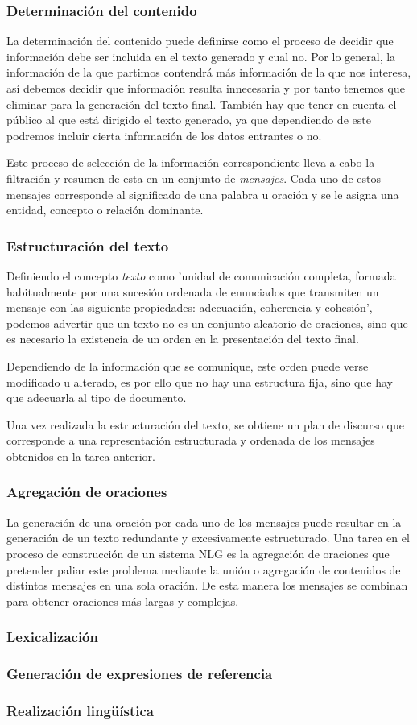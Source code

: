 \subsubsection{Determinación del contenido}
La determinación del contenido puede definirse como el proceso de decidir que información debe ser incluida en el texto generado y cual no. Por lo general, la información de la que partimos contendrá más información de la que nos interesa, así debemos decidir que información resulta innecesaria y por tanto tenemos que eliminar para la generación del texto final. También hay que tener en cuenta el público al que está dirigido el texto generado, ya que dependiendo de este podremos incluir cierta información de los datos entrantes o no.

Este proceso de selección de la información correspondiente lleva a cabo la filtración y resumen de esta en un conjunto de \textit{mensajes}. Cada uno de estos mensajes corresponde al significado de una palabra u oración y se le asigna una entidad, concepto o relación dominante.

\subsubsection{Estructuración del texto}
Definiendo el concepto \textit{texto} como 'unidad de comunicación completa, formada habitualmente por una sucesión ordenada de enunciados que transmiten un mensaje con las siguiente propiedades: adecuación, coherencia y cohesión', podemos advertir que un texto no es un conjunto aleatorio de oraciones, sino que es necesario la existencia de un orden en la presentación del texto final.

Dependiendo de la información que se comunique, este orden puede verse modificado u alterado, es por ello que no hay una estructura fija, sino que hay que adecuarla al tipo de documento.

Una vez realizada la estructuración del texto, se obtiene un plan de discurso que corresponde a una representación estructurada y ordenada de los mensajes obtenidos en la tarea anterior.

\subsubsection{Agregación de oraciones}
La generación de una oración por cada uno de los mensajes puede resultar en la generación de un texto redundante y excesivamente estructurado. Una tarea en el proceso de construcción de un sistema NLG es la agregación de oraciones que pretender paliar este problema mediante la unión o agregación de contenidos de distintos mensajes en una sola oración. De esta manera los mensajes se combinan para obtener oraciones más largas y complejas. 

\subsubsection{Lexicalización}

\subsubsection{Generación de expresiones de referencia}

\subsubsection{Realización lingüística}

